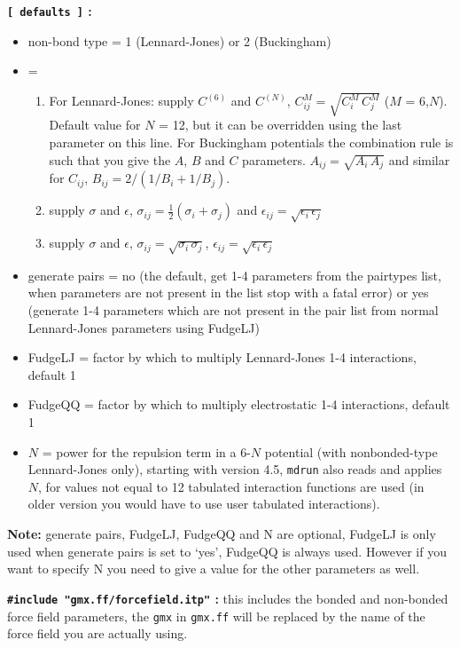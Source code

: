 {\bf {\tt [~defaults~]} :}
\begin{itemize}
\item non-bond type = 1 (Lennard-Jones) or 2 (Buckingham)
\item {} = 
\begin{enumerate}
\item For Lennard-Jones: supply $C^{(6)}$ and $C^{(N)}$,
$C^{M}_{ij}=\sqrt{C^M_i\,C^M_j}$ ($M$ = 6,$N$).
Default value for $N$ = 12, but it can be
overridden using the last parameter on this line.
For Buckingham potentials the combination rule is such that you give the
$A$, $B$ and $C$ parameters. $A_{ij} = \sqrt{A_i\, A_j}$ and similar for 
$C_{ij}$, $B_{ij} = 2/(1/B_i + 1/B_j)$.
\item supply $\sigma$ and $\epsilon$,
$\sigma_{ij}=\frac{1}{2}(\sigma_i+\sigma_j)$ and 
$\epsilon_{ij}=\sqrt{\epsilon_i\,\epsilon_j}$
\item supply $\sigma$ and $\epsilon$, $\sigma_{ij}=\sqrt{\sigma_i\,\sigma_j}$,
$\epsilon_{ij}=\sqrt{\epsilon_i\,\epsilon_j}$
\end{enumerate}
\item generate pairs = no
(the default, get 1-4 parameters from the pairtypes list, when parameters
are not present in the list stop with a fatal error)
or yes (generate 1-4 parameters which are not present in the pair list
from normal Lennard-Jones parameters using FudgeLJ)
\item FudgeLJ = factor by which to multiply Lennard-Jones 1-4 interactions, default 1
\item FudgeQQ = factor by which to multiply electrostatic 1-4 interactions, default 1
\item $N$ = power for the repulsion term in a 6-$N$ potential (with 
nonbonded-type Lennard-Jones only), starting with {\gromacs} version 4.5,
{\tt mdrun} also reads and applies $N$, for values not equal to 12 tabulated
interaction functions are used
(in older version you would have to use user tabulated interactions).
\end{itemize}
{\bf Note:} generate pairs, FudgeLJ, FudgeQQ and N are optional,
FudgeLJ is only used when generate pairs is set to `yes',
FudgeQQ is always used. However if you
want to specify N you need to give a value for the other parameters as well.

%

{\bf {\tt \#include "gmx.ff/forcefield.itp"} :} this includes the bonded and
non-bonded force field parameters, the {\tt gmx} in {\tt gmx.ff} will be
replaced by the name of the force field you are actually using.


